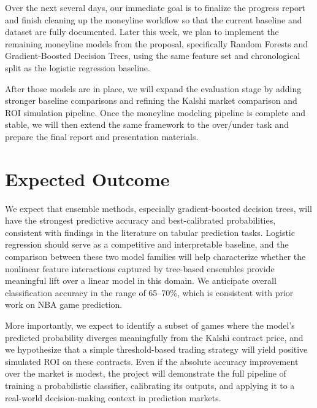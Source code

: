 \documentclass[sigconf]{acmart}
\begin{document}
Over the next several days, our immediate goal is to finalize the progress report and finish cleaning up the moneyline workflow so that the current baseline and dataset are fully documented. Later this week, we plan to implement the remaining moneyline models from the proposal, specifically Random Forests and Gradient-Boosted Decision Trees, using the same feature set and chronological split as the logistic regression baseline.

After those models are in place, we will expand the evaluation stage by adding stronger baseline comparisons and refining the Kalshi market comparison and ROI simulation pipeline. Once the moneyline modeling pipeline is complete and stable, we will then extend the same framework to the over/under task and prepare the final report and presentation materials.

\section{Expected Outcome}
We expect that ensemble methods, especially gradient-boosted decision trees, will have the strongest predictive accuracy and best-calibrated probabilities, consistent with findings in the literature on tabular prediction tasks. Logistic regression should serve as a competitive and interpretable baseline, and the comparison between these two model families will help characterize whether the nonlinear feature interactions captured by tree-based ensembles provide meaningful lift over a linear model in this domain. We anticipate overall classification accuracy in the range of 65--70\%, which is consistent with prior work on NBA game prediction.

More importantly, we expect to identify a subset of games where the model's predicted probability diverges meaningfully from the Kalshi contract price, and we hypothesize that a simple threshold-based trading strategy will yield positive simulated ROI on these contracts. Even if the absolute accuracy improvement over the market is modest, the project will demonstrate the full pipeline of training a probabilistic classifier, calibrating its outputs, and applying it to a real-world decision-making context in prediction markets.
\end{document}
